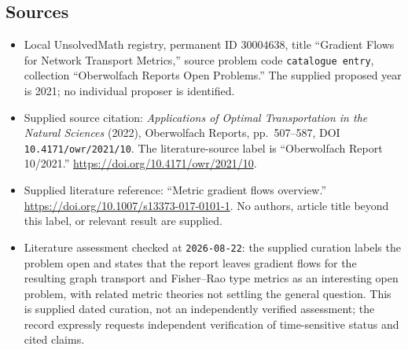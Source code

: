 \documentclass[11pt]{article}
\begin{document}
\subsection{Sources}
\begin{itemize}
\item Local UnsolvedMath registry, permanent ID \(30004638\), title ``Gradient Flows for Network Transport Metrics,'' source problem code \texttt{catalogue entry}, collection ``Oberwolfach Reports Open Problems.'' The supplied proposed year is 2021; no individual proposer is identified.
\item Supplied source citation: \emph{Applications of Optimal Transportation in the Natural Sciences} (2022), Oberwolfach Reports, pp.~507--587, DOI \texttt{10.4171/owr/2021/10}. The literature-source label is ``Oberwolfach Report 10/2021.'' \url{https://doi.org/10.4171/owr/2021/10}.
\item Supplied literature reference: ``Metric gradient flows overview.'' \url{https://doi.org/10.1007/s13373-017-0101-1}. No authors, article title beyond this label, or relevant result are supplied.
\item Literature assessment checked at \texttt{2026-08-22}: the supplied curation labels the problem open and states that the report leaves gradient flows for the resulting graph transport and Fisher--Rao type metrics as an interesting open problem, with related metric theories not settling the general question. This is supplied dated curation, not an independently verified assessment; the record expressly requests independent verification of time-sensitive status and cited claims.
\end{itemize}
\end{document}
